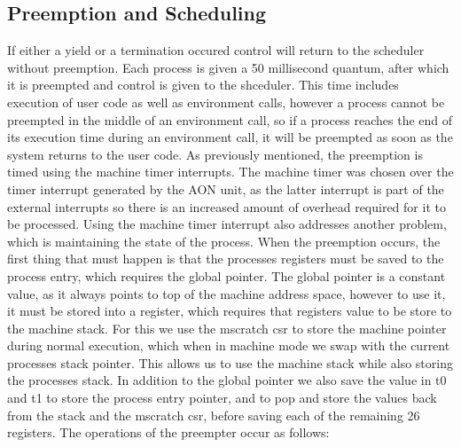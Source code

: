 \subsection{Preemption and Scheduling}
If either a yield or a termination occured control will return to the scheduler without preemption. Each process is given a 50 millisecond quantum, after which it is preempted and control is given to the shceduler. This time includes execution of user code as well as environment calls, however a process cannot be preempted in the middle of an environment call, so if a process reaches the end of its execution time during an environment call, it will be preempted as soon as the system returns to the user code. As previously mentioned, the preemption is timed using the machine timer interrupts. The machine timer was chosen over the timer interrupt generated by the AON unit, as the latter interrupt is part of the external interrupts so there is an increased amount of overhead required for it to be processed. Using the machine timer interrupt also addresses another problem, which is maintaining the state of the process. When the preemption occurs, the first thing that must happen is that the processes registers must be saved to the process entry, which requires the global pointer. The global pointer is a constant value, as it always points to top of the machine address space, however to use it, it must be stored into a register, which requires that registers value to be store to the machine stack. For this we use the mscratch csr to store the machine pointer during normal execution, which when in machine mode we swap with the current processes stack pointer. This allows us to use the machine stack while also storing the processes stack. In addition to the global pointer we also save the value in t0 and t1 to store the process entry pointer, and to pop and store the values back from the stack and the mscratch csr, before saving each of the remaining 26 registers. The operations of the preempter occur as follows:
